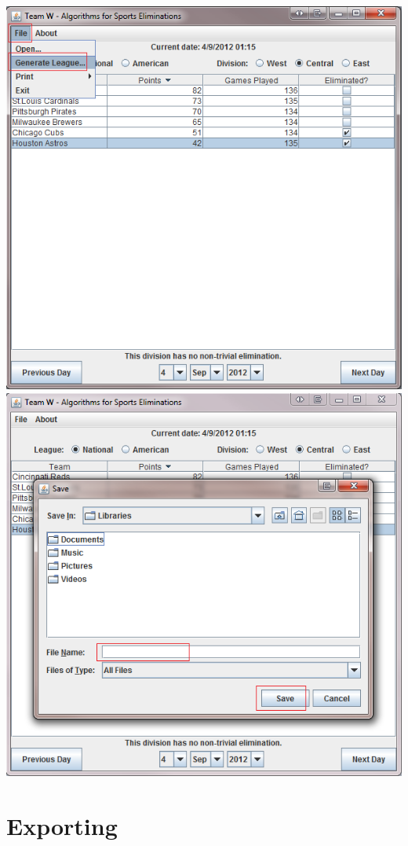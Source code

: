 \includegraphics[width=\linewidth,keepaspectratio]{images/userManualDesk7.png}
\includegraphics[width=\linewidth,keepaspectratio]{images/userManualDesk8.png}

\section{Exporting}

